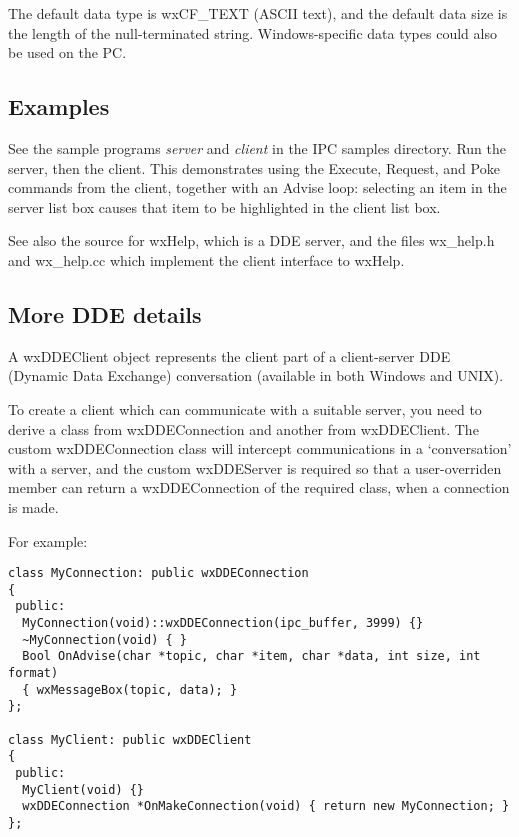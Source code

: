 The default data type is wxCF\_TEXT (ASCII text), and the default data
size is the length of the null-terminated string. Windows-specific data
types could also be used on the PC.

\subsection{Examples}

See the sample programs {\it server}\/ and {\it client}\/ in the IPC
samples directory.  Run the server, then the client. This demonstrates
using the Execute, Request, and Poke commands from the client, together
with an Advise loop: selecting an item in the server list box causes
that item to be highlighted in the client list box.

See also the source for wxHelp, which is a DDE server, and the files
wx\_help.h and wx\_help.cc which implement the client interface to
wxHelp.

\subsection{More DDE details}

A wxDDEClient object represents the client part of a client-server DDE
(Dynamic Data Exchange) conversation (available in both
Windows and UNIX).

To create a client which can communicate with a suitable server,
you need to derive a class from wxDDEConnection and another from wxDDEClient.
The custom wxDDEConnection class will intercept communications in
a `conversation' with a server, and the custom wxDDEServer is required
so that a user-overriden  member can return
a wxDDEConnection of the required class, when a connection is made.

For example:

\begin{verbatim}
class MyConnection: public wxDDEConnection
{
 public:
  MyConnection(void)::wxDDEConnection(ipc_buffer, 3999) {}
  ~MyConnection(void) { }
  Bool OnAdvise(char *topic, char *item, char *data, int size, int format)
  { wxMessageBox(topic, data); }
};

class MyClient: public wxDDEClient
{
 public:
  MyClient(void) {}
  wxDDEConnection *OnMakeConnection(void) { return new MyConnection; }
};

\end{verbatim}

